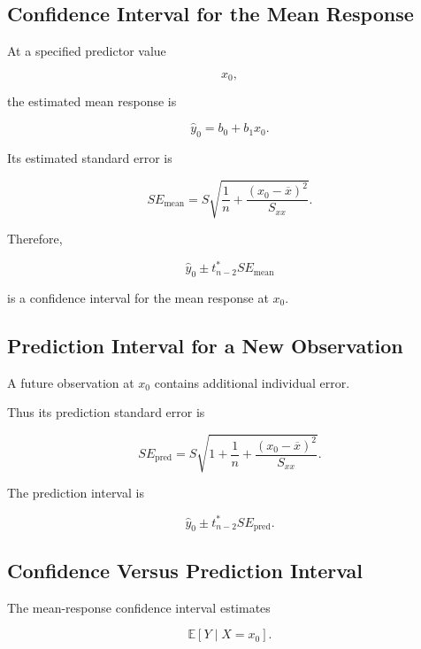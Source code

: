 \subsection{Confidence Interval for the Mean Response}
\label{subsec:ci-mean-response}

At a specified predictor value

\[
x_0,
\]

the estimated mean response is

\[
\boxed{
\widehat{y}_0
=
b_0+b_1x_0.
}
\]

Its estimated standard error is

\[
\boxed{
SE_{\text{mean}}
=
S
\sqrt{
\frac1n
+
\frac{
(x_0-\overline{x})^2
}{
S_{xx}
}
}.
}
\]

Therefore,

\[
\boxed{
\widehat{y}_0
\pm
t^*_{n-2}
SE_{\text{mean}}
}
\]

is a confidence interval for the mean response at \(x_0\).

\subsection{Prediction Interval for a New Observation}
\label{subsec:prediction-interval-regression}

A future observation at \(x_0\) contains additional individual error.

Thus its prediction standard error is

\[
\boxed{
SE_{\text{pred}}
=
S
\sqrt{
1
+
\frac1n
+
\frac{
(x_0-\overline{x})^2
}{
S_{xx}
}
}.
}
\]

The prediction interval is

\[
\boxed{
\widehat{y}_0
\pm
t^*_{n-2}
SE_{\text{pred}}.
}
\]

\subsection{Confidence Versus Prediction Interval}
\label{subsec:confidence-vs-prediction-regression}

The mean-response confidence interval estimates

\[
\mathbb{E}[Y\mid X=x_0].
\]

